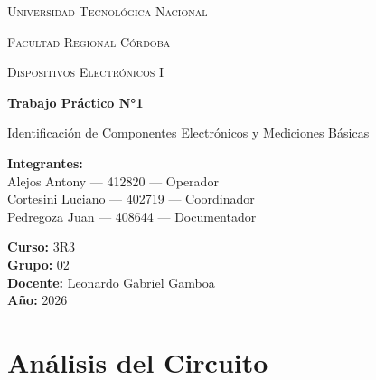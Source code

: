 \documentclass[12pt,a4paper]{article}
\begin{document}
\begin{titlepage}
    \centering

    {\scshape\LARGE Universidad Tecnológica Nacional \par}
    \vspace{0.3cm}
    {\scshape\Large Facultad Regional Córdoba \par}
    \vspace{1.5cm}

    {\scshape\Large Dispositivos Electrónicos I \par}
    \vspace{2cm}

    {\Huge\bfseries Trabajo Práctico N°1 \par}
    \vspace{0.5cm}
    {\LARGE Identificación de Componentes Electrónicos y
Mediciones Básicas \par}

    \vspace{2cm}

    \begin{flushleft}
    \textbf{Integrantes:} \\
    Alejos Antony --- 412820 --- Operador\\
    Cortesini Luciano --- 402719 --- Coordinador\\
    Pedregoza Juan --- 408644 --- Documentador\\

    \vspace{0.5cm}

    \textbf{Curso:} 3R3 \\
    \textbf{Grupo:} 02 \\
    \textbf{Docente:}  Leonardo Gabriel Gamboa\\
    \textbf{Año:} 2026 \\
    \end{flushleft}

    \vfill

\end{titlepage}
\thispagestyle{empty}

\vspace{1cm}

\tableofcontents
\newpage

 
\section{Análisis del Circuito}
 
\end{document}
